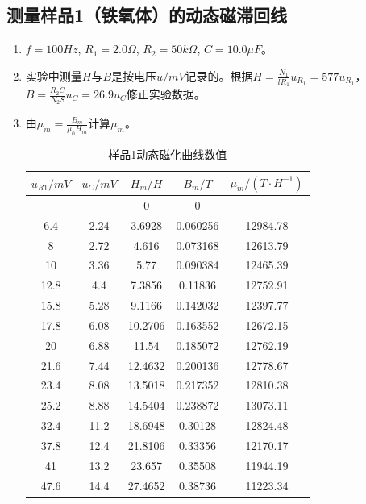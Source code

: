 \documentclass[11pt]{article}
\begin{document}
\subsection{测量样品1（铁氧体）的动态磁滞回线}
\begin{enumerate}
    \item $f=100Hz$, $R_1=2.0\Omega$, $R_2=50k\Omega$, $C=10.0\mu F$。
    \item 实验中测量$H$与$B$是按电压$u/mV$记录的。根据$H=\frac{N_1}{lR_1}u_{R_1}=577u_{R_1}$，$B=\frac{R_2C}{N_2S}u_C=26.9u_C$修正实验数据。
    \item 由$\mu_m=\frac{B_m}{\mu_0 H_m}$计算$\mu_m$。
        \begin{table}[H]
          \centering
          \caption{样品1动态磁化曲线数值}
            \begin{tabular}{|c|c|c|c|c|}\hline
            $u_{R1}/mV$    & $u_C/mV$     & $H_m/H$     & $B_m/T$     & $\mu_m/(T\cdot H^{-1})$ \\\hline
                   &        & 0      & 0      &  \\\hline
            6.4    & 2.24   & 3.6928 & 0.060256 & 12984.78 \\\hline
            8      & 2.72   & 4.616  & 0.073168 & 12613.79 \\\hline
            10     & 3.36   & 5.77   & 0.090384 & 12465.39 \\\hline
            12.8   & 4.4    & 7.3856 & 0.11836 & 12752.91 \\\hline
            15.8   & 5.28   & 9.1166 & 0.142032 & 12397.77 \\\hline
            17.8   & 6.08   & 10.2706 & 0.163552 & 12672.15 \\\hline
            20     & 6.88   & 11.54  & 0.185072 & 12762.19 \\\hline
            21.6   & 7.44   & 12.4632 & 0.200136 & 12778.67 \\\hline
            23.4   & 8.08   & 13.5018 & 0.217352 & 12810.38 \\\hline
            25.2   & 8.88   & 14.5404 & 0.238872 & 13073.11 \\\hline
            32.4   & 11.2   & 18.6948 & 0.30128 & 12824.48 \\\hline
            37.8   & 12.4   & 21.8106 & 0.33356 & 12170.17 \\\hline
            41     & 13.2   & 23.657 & 0.35508 & 11944.19 \\\hline
            47.6   & 14.4   & 27.4652 & 0.38736 & 11223.34 \\\hline

\end{tabular}
\end{table}
\end{enumerate}
\end{document}
